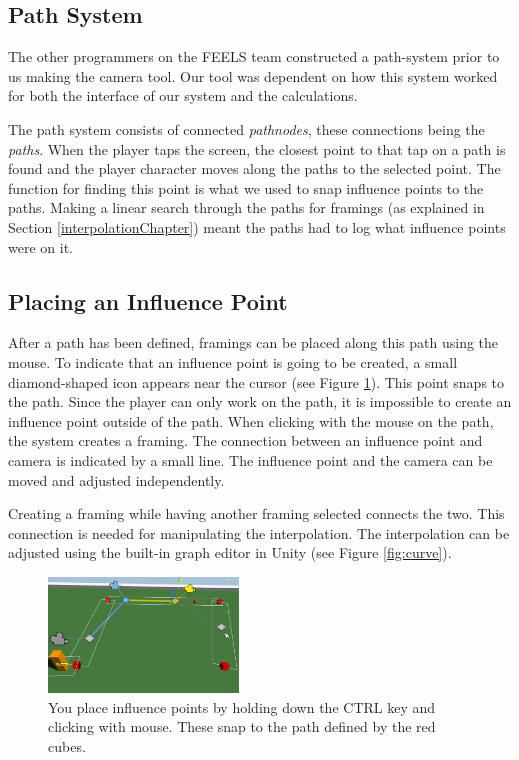 \subsection{Path System}
The other programmers on the FEELS team constructed a path-system prior to us making the camera tool. Our tool was dependent on how this system worked for both the interface of our system and the calculations.

The path system consists of connected \textit{pathnodes}, these connections being the \textit{paths}. When the player taps the screen, the closest point to that tap on a path is found and the player character moves along the paths to the selected point. The function for finding this point is what we used to snap influence points to the paths. Making a linear search through the paths for framings (as explained in Section \ref{interpolationChapter}) meant the paths had to log what influence points were on it.

\subsection{Placing an Influence Point}
After a path has been defined, framings can be placed along this path using the mouse. To indicate that an influence point is going to be created, a small diamond-shaped icon appears near the cursor (see Figure \ref{fig:placingInfluencePoint}). This point snaps to the path. Since the player can only work on the path, it is impossible to create an influence point outside of the path. When clicking with the mouse on the path, the system creates a framing. The connection between an influence point and camera is indicated by a small line. The influence point and the camera can be moved and adjusted independently.

Creating a framing while having another framing selected connects the two. This connection is needed for manipulating the interpolation. The interpolation can be adjusted using the built-in graph editor in Unity (see Figure \ref{fig:curve}).

\begin{figure}[htbp]
\centering
\includegraphics[width=0.45\textwidth]{Pics/placingInfluencePoint}
\caption{You place influence points by holding down the CTRL key and clicking with mouse. These snap to the path defined by the red cubes.}
\label{fig:placingInfluencePoint}
\end{figure}

